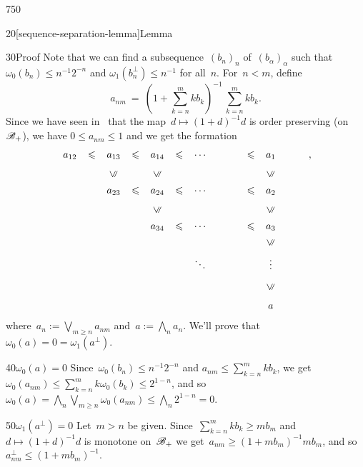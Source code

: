 \begin{parsec}{750}
\begin{point}{20}[sequence-separation-lemma]{Lemma}
\begin{point}{30}{Proof}
Note that we can find a subsequence~$(b_n)_n$ of~$(b_\alpha)_\alpha$
such that $\omega_0( b_n ) 
	\leq n^{-1}2^{-n}$
and $\omega_1(b_n^\perp)\leq n^{-1}$
for all~$n$.
For~$n < m$, define
\begin{equation*}
\textstyle
a_{nm}\ = \ (1+\sum_{k=n}^m kb_k)^{-1} \,\sum_{k=n}^m kb_k.
\end{equation*}
Since we have seen in~
that the map~$d\mapsto (1+d)^{-1}d$ is order preserving
(on~$\mathscr{B}_{+}$),
we have $0\leq a_{nm}\leq 1$
and we get the formation
\begin{equation*}
\renewcommand{\labelstyle}{\textstyle}
\xymatrix{
a_{12}\ar@{}|-{\leq}[r] & 
a_{13}\ar@{}|-{\leq}[r] & 
a_{14}\ar@{}|-{\leq}[r]  & 
\dotsb & \ar@{}|-{\leq}[r]& a_1 \\
&
a_{23} \ar@{}|-{\leq}[r] \ar@{}[u]|-{\uleq} &
a_{24} \ar@{}|-{\leq}[r]  \ar@{}[u]|-{\uleq} &
\dotsb &\ar@{}|-{\leq}[r]& a_2  \ar@{}[u]|-{\uleq} \\
&
&
a_{34} \ar@{}|-{\leq}[r]  \ar@{}[u]|-{\uleq} & 
\dotsb & \ar@{}|-{\leq}[r] & a_3  \ar@{}[u]|-{\uleq} 
\\
&&&\ddots&&\vdots \ar@{}[u]|-{\uleq}& \\
&&&&&a\ar@{}[u]|-{\uleq}
},
\end{equation*}
where~$a_n:= \bigvee_{m\geq n} a_{nm}$
and~$a := \bigwedge_n a_n$.
We'll prove that~$\omega_0(a)=0=\omega_1(a^\perp)$.
\begin{point}{40}{$\omega_0(a)=0$}%
	Since~$\omega_0(b_n)\leq n^{-1}2^{-n}$ 
and $a_{nm}\leq \sum_{k=n}^m k b_k$,
we get~$\omega_0(a_{nm})\leq \sum_{k=n}^m k\omega_0(b_k) \leq 2^{1-n}$,
and so $\omega_0(a)=\bigwedge_n\bigvee_{m\geq n} \omega_0(a_{nm})
\leq \bigwedge_n 2^{1-n} = 0$.
\end{point}
\begin{point}{50}{$\omega_1(a^\perp )=0$}%
Let~$m> n$ be given.
Since~$\sum_{k=n}^m kb_k \geq mb_m$
and $d\mapsto (1+d)^{-1}d$
is monotone on~$\mathscr{B}_{+}$
we get~$a_{nm} \geq (1+mb_m)^{-1} mb_m$,
and so~$a_{nm}^\perp \leq (1+mb_m)^{-1}$.


\end{point}
\end{point}
\end{point}
\end{parsec}
